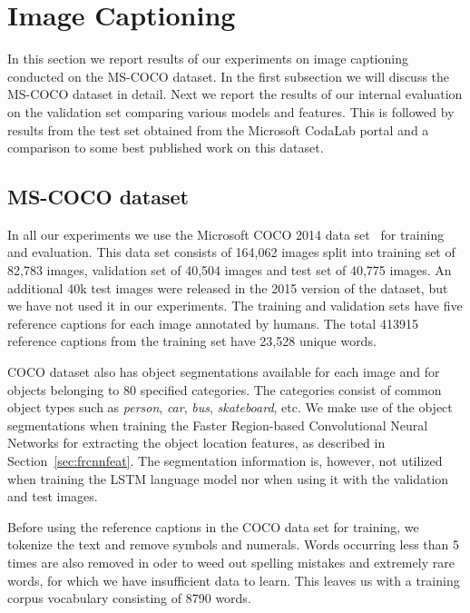 \section{Image Captioning}

In this section we report results of our experiments on image captioning
conducted on the MS-COCO dataset.
In the first subsection we will discuss the MS-COCO dataset in detail.
Next we report the results of our internal evaluation on the validation set
comparing various models and features.
This is followed by results from the test set obtained from the Microsoft
CodaLab portal and a comparison to some best published work on this dataset.

\subsection{MS-COCO dataset}
In all our experiments we use the Microsoft COCO 2014 data set~\cite{Lin2014}
for training and evaluation.
This data set consists of 164,062 images split into training set of 82,783
images, validation set of 40,504 images and test set of 40,775 images. 
An additional 40k test images were released in the 2015 version of the dataset,
but we have not used it in our experiments.
The training and validation sets have five reference captions for each image
annotated by humans. 
The total 413915 reference captions from the training set have 23,528 unique
words.

COCO dataset also has object segmentations available for each image and for
objects belonging to 80 specified categories.
The categories consist of common object types such as \emph{person}, \emph{car},
\emph{bus}, \emph{skateboard}, etc.
We make use of the object segmentations when training the Faster Region-based
Convolutional Neural Networks for extracting the object location features, as
described in Section~\ref{sec:frcnnfeat}.
The segmentation information is, however, not utilized when training the LSTM
language model nor when using it with the validation and test images.

Before using the reference captions in the COCO data set for training, we
tokenize the text and remove symbols and numerals.
Words occurring less than 5 times are also removed in oder to weed out spelling
mistakes and extremely rare words, for which we have insufficient data to learn.
This leaves us with a training corpus vocabulary consisting of 8790 words. 

